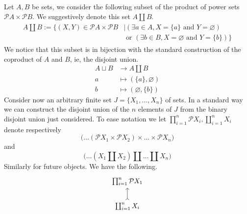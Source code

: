 \documentclass{tac}
\newcommand{\call}[1]{\mathcal{#1}}
\newcommand{\lto}{\longrightarrow}
\begin{document}
	Let $A,B$ be sets, we consider the following subset of the product of power sets $\call{P}A \times \call{P}B$. We suggestively denote this set $A \coprod B$.
	\begin{align}
		\begin{split}
			\label{eq:bin_disjoint_union}A \coprod B := \big\lbrace (X,Y) \in \call{P}A \times \call{P}B &\mid (\exists a \in A, X = \lbrace a \rbrace \text{ and }Y = \varnothing)\\
		&\text{ or } (\exists b \in B, X = \varnothing \text{ and }Y = \lbrace b \rbrace )\big\rbrace
		\end{split}
	\end{align}
	We notice that this subset is in bijection with the standard construction of the coproduct of $A$ and $B$, ie, the disjoint union.
	\begin{align*}
		A \sqcup B &\lto A \coprod B\\
		a &\longmapsto (\lbrace a \rbrace, \varnothing)\\
		b &\longmapsto (\varnothing, \lbrace b \rbrace)
	\end{align*}
	Consider now an arbitrary finite set $J = \lbrace X_1,...,X_n\rbrace$ of sets. In a standard way we can construct the disjoint union of the $n$ elements of $J$ from the binary disjoint union just considered. To ease notation we let $\prod_{i = 1}^n\call{P}X_i, \coprod_{i = 1}^n X_i$ denote respectively 
	\begin{equation*}
		\big(\hdots (\call{P}X_1 \times \call{P}X_2)\times \hdots \times\call{P}X_n\big)
		\end{equation*}
	and
	\begin{equation*}
		\big(\hdots (X_1 \coprod X_2) \coprod \hdots \coprod X_n\big)
		\end{equation*}
	Similarly for future objects. We have the following.
	\begin{equation}
		\begin{tikzcd}
			\prod_{i=1}^n \call{P}X_1\\
			\coprod_{i = 1}^n X_i\arrow[u,rightarrowtail]
		\end{tikzcd}
	\end{equation}
\end{document}
